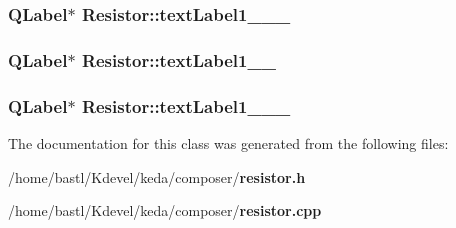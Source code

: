 \subsubsection{\setlength{\rightskip}{0pt plus 5cm}QLabel$\ast$ {\bf Resistor::text\-Label1\_\_\_}}\label{classResistor_1671a2e501448b4b1568b77eb64cf336}


\subsubsection{\setlength{\rightskip}{0pt plus 5cm}QLabel$\ast$ {\bf Resistor::text\-Label1\_\_}}\label{classResistor_fe5af8d88934b635303f290c67eddf11}


\subsubsection{\setlength{\rightskip}{0pt plus 5cm}QLabel$\ast$ {\bf Resistor::text\-Label1\_\_\_}}\label{classResistor_a5970359eaaefa2cbc0863d538503900}




The documentation for this class was generated from the following files:\begin{CompactItemize}
\item 
/home/bastl/Kdevel/keda/composer/{\bf resistor.h}\item 
/home/bastl/Kdevel/keda/composer/{\bf resistor.cpp}\end{CompactItemize}

